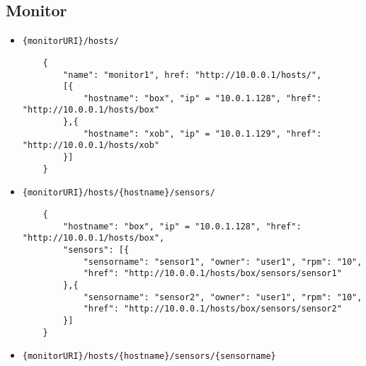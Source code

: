 \documentclass[a4paper]{article}
\begin{document}
\subsection{Monitor}
\begin{itemize}
	\item \texttt{\{monitorURI\}/hosts/}
	\begin{verbatim}
	{
		"name": "monitor1", href: "http://10.0.0.1/hosts/",
		[{
			"hostname": "box", "ip" = "10.0.1.128", "href": "http://10.0.0.1/hosts/box"
		},{
			"hostname": "xob", "ip" = "10.0.1.129", "href": "http://10.0.0.1/hosts/xob"
		}]
	}
	\end{verbatim}
	\item \texttt{\{monitorURI\}/hosts/\{hostname\}/sensors/}
	\begin{verbatim}
	{
		"hostname": "box", "ip" = "10.0.1.128", "href": "http://10.0.0.1/hosts/box",
		"sensors": [{
			"sensorname": "sensor1", "owner": "user1", "rpm": "10",
			"href": "http://10.0.0.1/hosts/box/sensors/sensor1"
		},{
			"sensorname": "sensor2", "owner": "user1", "rpm": "10",
			"href": "http://10.0.0.1/hosts/box/sensors/sensor2"
		}]
	}
	\end{verbatim}
	\item \texttt{\{monitorURI\}/hosts/\{hostname\}/sensors/\{sensorname\}}
	\begin{verbatim}

\end{verbatim}
\end{itemize}
\end{document}
